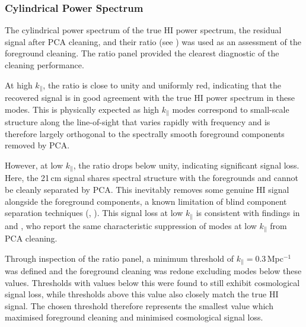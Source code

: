 \subsubsection{Cylindrical Power Spectrum}

The cylindrical power spectrum of the true HI power spectrum, the residual signal after PCA cleaning, and their ratio (see ) was used as an assessment of the foreground cleaning. The ratio panel provided the clearest diagnostic of the cleaning performance. 

At high $k_{\parallel}$, the ratio is close to unity and uniformly red, indicating that the recovered signal is in good agreement with the true HI power spectrum in these modes. This is physically expected as high $k_{\parallel}$ modes correspond to small-scale structure along the line-of-sight that varies rapidly with frequency and is therefore largely orthogonal to the spectrally smooth foreground components removed by PCA. 

However, at low $k_{\parallel}$, the ratio drops below unity, indicating significant signal loss. Here, the 21\,cm signal shares spectral structure with the foregrounds and cannot be cleanly separated by PCA. This inevitably removes some genuine HI signal alongside the foreground components, a known limitation of blind component separation techniques (\cite{delchambreWeightedPrincipalComponent2015a}, \cite{baileyPrincipalComponentAnalysis2012b}). This signal loss at low $k_{\parallel}$ is consistent with findings in \cite{mertensStatistical21cmSignal2018} and \cite{collaborationMeerKLASSLbandDeepfield2025a}, who report the same characteristic suppression of modes at low $k_{\parallel}$ from PCA cleaning. 

Through inspection of the ratio panel, a minimum threshold of $k_\parallel = 0.3$\,Mpc$^{-1}$ was defined and the foreground cleaning was redone excluding modes below these values. Thresholds with values below this were found to still exhibit cosmological signal loss, while thresholds above this value also closely match the true HI signal. The chosen threshold therefore represents the smallest value which maximised foreground cleaning and minimised cosmological signal loss.

